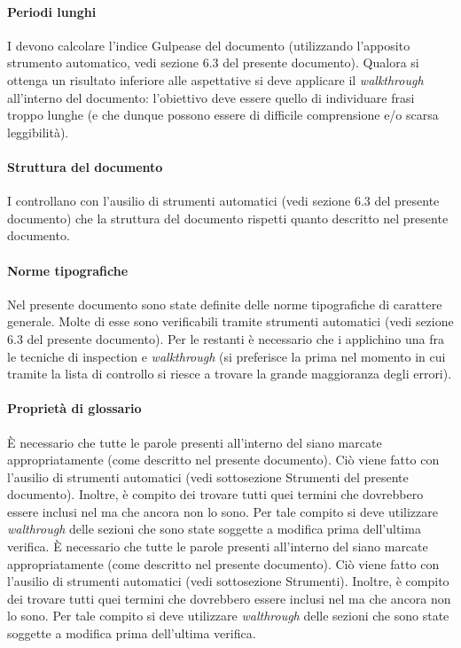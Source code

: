 			\paragraph{Periodi lunghi}
				I  devono calcolare l'indice Gulpease del documento (utilizzando l'apposito strumento automatico, vedi sezione 6.3 del presente documento). Qualora si ottenga un risultato inferiore alle aspettative si deve applicare il \textit{walkthrough} all'interno del documento: l'obiettivo deve essere quello di individuare frasi troppo lunghe (e che dunque possono essere di difficile comprensione e/o scarsa leggibilità).
			\paragraph{Struttura del documento}
				I  controllano con l'ausilio di strumenti automatici (vedi sezione 6.3 del presente documento) che la struttura del documento rispetti quanto descritto nel presente documento.
			\paragraph{Norme tipografiche}
				Nel presente documento sono state definite delle norme tipografiche di carattere generale. Molte di esse sono verificabili tramite strumenti automatici (vedi sezione 6.3 del presente documento). Per le restanti è necessario che i  applichino una fra le tecniche di inspection e \textit{walkthrough}	(si preferisce la prima nel momento in cui tramite la lista di controllo si riesce a trovare la grande maggioranza degli errori).
			\paragraph{Proprietà di glossario}
				È necessario che tutte le parole presenti all'interno del  siano marcate appropriatamente (come descritto nel presente 
				documento). Ciò viene fatto con l'ausilio di strumenti automatici (vedi sottosezione Strumenti del presente documento). Inoltre, è compito dei  trovare tutti quei termini che dovrebbero essere inclusi nel  ma che ancora non lo sono. Per tale compito si deve utilizzare \textit{walthrough} delle sezioni che sono state soggette a modifica prima dell'ultima verifica.
				È necessario che tutte le parole presenti all'interno del  siano marcate appropriatamente (come descritto nel presente documento). Ciò viene fatto con l'ausilio di strumenti automatici (vedi sottosezione Strumenti). Inoltre, è compito dei  trovare tutti quei termini che dovrebbero essere inclusi nel  ma che ancora non lo sono. Per tale compito si deve utilizzare \textit{walthrough} delle sezioni che sono state soggette a modifica prima dell'ultima verifica.
